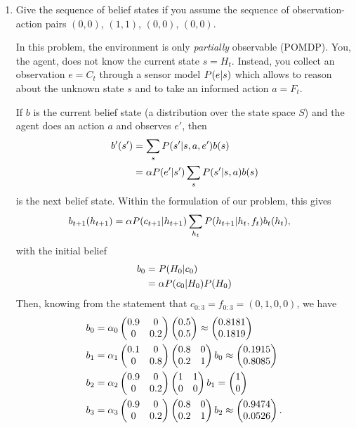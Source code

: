 \documentclass[11pt, a4paper]{article}
\begin{document}
\begin{enumerate}
    \item Give the sequence of belief states if you assume the sequence of observation-action pairs $(0, 0)$, $(1, 1)$, $(0, 0)$, $(0, 0)$.
    
    \begin{solution}
        In this problem, the environment is only \emph{partially} observable (POMDP). You, the agent, does not know the current state $s = H_t$. Instead, you collect an observation $e = C_t$ through a sensor model $P(e \vert s)$ which allows to reason about the unknown state $s$ and to take an informed action $a = F_t$.
    
        If $b$ is the current belief state (a distribution over the state space $S$) and the agent does an action $a$ and observes $e'$, then
        \begin{align*}
            b'(s') & = \sum_s P(s' \vert s, a, e') b(s) \\
            & = \alpha P(e' \vert s') \sum_s P(s' \vert s, a) b(s)
        \end{align*}
        is the next belief state. Within the formulation of our problem, this gives
        \begin{align*}
            b_{t+1}(h_{t+1}) & = \alpha P(c_{t+1} \vert h_{t+1}) \sum_{h_t} P(h_{t+1} \vert h_t, f_t) b_t(h_t),
        \end{align*}
        with the initial belief
        \begin{align*}
            b_0 & = P(H_0 \vert c_0) \\
            & = \alpha P(c_0 \vert H_0) P(H_0)
        \end{align*}
        Then, knowing from the statement that $c_{0:3} = f_{0:3} = (0, 1, 0, 0)$, we have
        \begin{align*}
            b_0 & = \alpha_0 \begin{pmatrix}0.9 & 0 \\ 0 & 0.2\end{pmatrix} \begin{pmatrix}0.5 \\ 0.5\end{pmatrix} \approx \begin{pmatrix}0.8181 \\ 0.1819\end{pmatrix} \\
            b_1 & = \alpha_1 \begin{pmatrix}0.1 & 0 \\ 0 & 0.8\end{pmatrix} \begin{pmatrix}0.8 & 0 \\ 0.2 & 1\end{pmatrix} b_0 \approx \begin{pmatrix}0.1915 \\ 0.8085\end{pmatrix} \\
            b_2 & = \alpha_2 \begin{pmatrix}0.9 & 0 \\ 0 & 0.2\end{pmatrix} \begin{pmatrix}1 & 1 \\ 0 & 0\end{pmatrix} b_1 = \begin{pmatrix}1 \\ 0\end{pmatrix} \\
            b_3 & = \alpha_3 \begin{pmatrix}0.9 & 0 \\ 0 & 0.2\end{pmatrix} \begin{pmatrix}0.8 & 0 \\ 0.2 & 1\end{pmatrix} b_2 \approx \begin{pmatrix}0.9474 \\ 0.0526\end{pmatrix} .
        \end{align*}
    \end{solution}
    

\end{enumerate}
\end{document}
